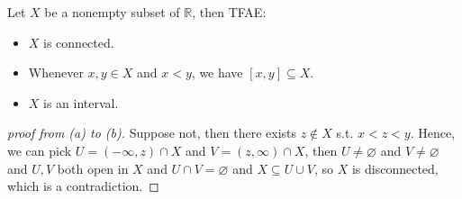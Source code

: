 \begin{theorem} \label{thm: connectedness in R TFAE}
    Let \(X\) be a nonempty subset of \(\mathbb{R} \), then TFAE: 
    \begin{itemize}
        \item [(a)] \(X\) is connected.  
        \item [(b)] Whenever \(x, y \in X\) and \(x < y\), we have \([x, y] \subseteq X\).    
        \item [(c)] \(X\) is an interval. 
    \end{itemize}  
\end{theorem}
\begin{proof}[proof from (a) to (b)]   
    Suppose not, then there exists \(z \notin X\) s.t. \(x < z < y\). Hence, we can pick \(U = (-\infty , z) \cap X\) and \(V = (z, \infty ) \cap X\), then \(U \neq \varnothing \) and \(V \neq \varnothing \) and \(U, V\) both open in \(X\) and \(U \cap V = \varnothing \) and \(X \subseteq U \cup V\), so \(X\) is disconnected, which is a contradiction.           
\end{proof} 
